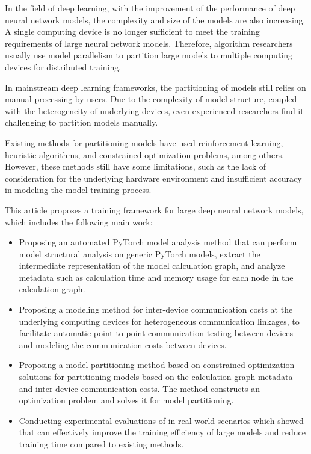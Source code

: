 In the field of deep learning, with the improvement of the performance of deep neural network models, the complexity and size of the models are also increasing. A single computing device is no longer sufficient to meet the training requirements of large neural network models. Therefore, algorithm researchers usually use model parallelism to partition large models to multiple computing devices for distributed training.

In mainstream deep learning frameworks, the partitioning of models still relies on manual processing by users. Due to the complexity of model structure, coupled with the heterogeneity of underlying devices, even experienced researchers find it challenging to partition models manually.

Existing methods for partitioning models have used reinforcement learning, heuristic algorithms, and constrained optimization problems, among others. However, these methods still have some limitations, such as the lack of consideration for the underlying hardware environment and insufficient accuracy in modeling the model training process.

This article proposes a training framework \sys{} for large deep neural network models, which includes the following main work:

\begin{itemize}
    \item  Proposing an automated PyTorch model analysis method that can perform model structural analysis on generic PyTorch models, extract the intermediate representation of the model calculation graph, and analyze metadata such as calculation time and memory usage for each node in the calculation graph.
    \item  Proposing a modeling method for inter-device communication costs at the underlying computing devices for heterogeneous communication linkages, to facilitate automatic point-to-point communication testing between devices and modeling the communication costs between devices.
    \item Proposing a model partitioning method based on constrained optimization solutions for partitioning models based on the calculation graph metadata and inter-device communication costs. The method constructs an optimization problem and solves it for model partitioning.
    \item Conducting experimental evaluations of \sys{} in real-world scenarios which showed that \sys{} can effectively improve the training efficiency of large models and reduce training time compared to existing methods.
\end{itemize}